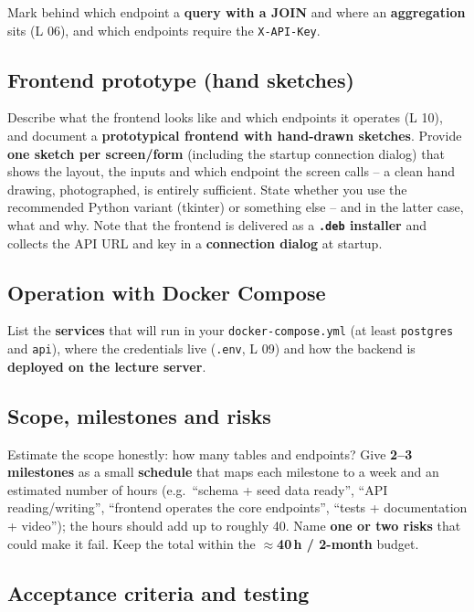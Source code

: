 \documentclass[11pt,a4paper]{article}
\begin{document}
Mark behind which endpoint a \textbf{query with a JOIN} and where an
\textbf{aggregation} sits (L 06), and which endpoints require the
\texttt{X-API-Key}.

\subsection{Frontend prototype (hand sketches)}

Describe what the frontend looks like and which endpoints it operates (L 10), and
document a \textbf{prototypical frontend with hand-drawn sketches}. Provide
\textbf{one sketch per screen/form} (including the startup connection dialog) that
shows the layout, the inputs and which endpoint the screen calls -- a clean hand
drawing, photographed, is entirely sufficient. State whether you use the
recommended Python variant (tkinter) or something else -- and in the latter case,
what and why. Note that the frontend is delivered as a \textbf{\texttt{.deb}
installer} and collects the API URL and key in a \textbf{connection dialog} at
startup.

\subsection{Operation with Docker Compose}

List the \textbf{services} that will run in your \texttt{docker-compose.yml} (at
least \texttt{postgres} and \texttt{api}), where the credentials live
(\texttt{.env}, L 09) and how the backend is \textbf{deployed on the lecture
server}.

\subsection{Scope, milestones and risks}

Estimate the scope honestly: how many tables and endpoints? Give \textbf{2--3
milestones} as a small \textbf{schedule} that maps each milestone to a week and
an estimated number of hours (e.g.\ ``schema + seed data ready'', ``API
reading/writing'', ``frontend operates the core endpoints'', ``tests +
documentation + video''); the hours should add up to roughly 40. Name
\textbf{one or two risks} that could make it fail. Keep the total within the
\textbf{$\approx$40\,h / 2-month} budget.

\subsection{Acceptance criteria and testing}
\end{document}
